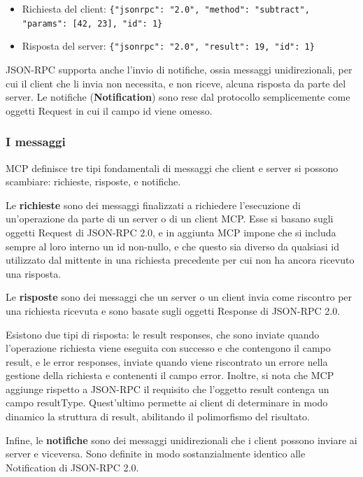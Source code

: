 \begin{itemize}
\item Richiesta del client: 
    \lstinline|{"jsonrpc": "2.0", "method": "subtract", "params": [42, 23], "id": 1}|

\item Risposta del server: 
    \lstinline|{"jsonrpc": "2.0", "result": 19, "id": 1}|
\end{itemize}

JSON-RPC supporta anche l'invio di notifiche, ossia messaggi
unidirezionali, per cui il client che li invia non necessita, e non
riceve, alcuna risposta da parte del server. Le notifiche
(\textbf{Notification}) sono rese dal protocollo semplicemente come
oggetti Request in cui il campo id viene omesso.

\subsubsection{I messaggi}\label{i-messaggi}

MCP definisce tre tipi fondamentali di messaggi che client e server si
possono scambiare: richieste, risposte, e notifiche.

Le \textbf{richieste} sono dei messaggi finalizzati a richiedere
l'esecuzione di un'operazione da parte di un server o di un client MCP.
Esse si basano sugli oggetti Request di JSON-RPC 2.0, e in aggiunta MCP
impone che si includa sempre al loro interno un id non-nullo, e che
questo sia diverso da qualsiasi id utilizzato dal mittente in una
richiesta precedente per cui non ha ancora ricevuto una risposta.

Le \textbf{risposte} sono dei messaggi che un server o un client invia
come riscontro per una richiesta ricevuta e sono basate sugli oggetti
Response di JSON-RPC 2.0.

Esistono due tipi di risposta: le result responses, che sono inviate
quando l'operazione richiesta viene eseguita con successo e che
contengono il campo result, e le error responses, inviate quando viene
riscontrato un errore nella gestione della richiesta e contenenti il
campo error. Inoltre, si nota che MCP aggiunge rispetto a JSON-RPC il
requisito che l'oggetto result contenga un campo resultType.
Quest'ultimo permette ai client di determinare in modo dinamico la
struttura di result, abilitando il polimorfismo del risultato.

Infine, le \textbf{notifiche} sono dei messaggi unidirezionali che i
client possono inviare ai server e viceversa. Sono definite in modo
sostanzialmente identico alle Notification di JSON-RPC 2.0.

